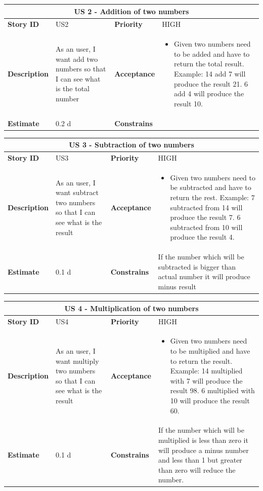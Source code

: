 \documentclass{article}
\begin{document}
\begin{tabular}{ |p{2cm}|p{5cm}|p{2cm}|p{4cm}| }
 \hline
 \multicolumn{4}{|c|}{US 2 - Addition of two numbers} \\
 \hline
 \textbf {Story ID}& US2 &  \textbf{Priority} & HIGH \\
 \hline
  \textbf{Description}   & As an user, I want add two numbers so that I can see what is the total number &    \textbf{Acceptance}& 
\begin{itemize}
\item Given two numbers need to be added and have to return the total result. Example: 14 add 7 will produce the result 21. 6 add 4 will produce the result 10. 
\end{itemize}
  \\
 \hline
 \textbf{Estimate} & 0.2 d &  \textbf{Constrains}&   \\
 \hline
\end{tabular}

\begin{tabular}{ |p{2cm}|p{5cm}|p{2cm}|p{4cm}| }
 \hline
 \multicolumn{4}{|c|}{US 3 - Subtraction of two numbers} \\
 \hline
 \textbf {Story ID}& US3 &  \textbf{Priority} & HIGH \\
 \hline
  \textbf{Description}   & As an user, I want subtract two numbers so that I can see what is the result &    \textbf{Acceptance}& 
\begin{itemize}
\item Given two numbers need to be subtracted and have to return the rest. Example: 7 subtracted from 14 will produce the result 7. 6 subtracted from 10 will produce the result 4. 
\end{itemize}
  \\
 \hline
 \textbf{Estimate} & 0.1 d &  \textbf{Constrains}&  If the number which will be subtracted is bigger than actual number it will produce minus result  \\
 \hline
\end{tabular}

\begin{tabular}{ |p{2cm}|p{5cm}|p{2cm}|p{4cm}| }
 \hline
 \multicolumn{4}{|c|}{US 4 - Multiplication of two numbers} \\
 \hline
 \textbf {Story ID}& US4 &  \textbf{Priority} & HIGH \\
 \hline
  \textbf{Description}   & As an user, I want multiply two numbers so that I can see what is the result &    \textbf{Acceptance}& 
\begin{itemize}
\item Given two numbers need to be multiplied and have to return the result. Example: 14 multiplied with 7 will produce the result 98. 6 multiplied with 10 will produce the result 60. 
\end{itemize}
  \\
 \hline
 \textbf{Estimate} & 0.1 d &  \textbf{Constrains}&  If the number which will be multiplied is less than zero it will produce a minus number and  less than 1 but greater than zero will reduce the number. \\
 \hline
\end{tabular}
\end{document}
